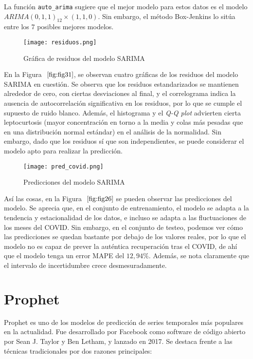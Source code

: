 \documentclass[12pt,twoside]{article}
\begin{document}
La función \texttt{auto\_arima} sugiere que el mejor modelo para estos datos es el modelo $ARIMA(0,1,1)_{12} \times (1,1,0)$. Sin embargo, el método Box-Jenkins lo sitúa entre los 7 posibles mejores modelos. 

\begin{figure}[h]
    \centering
    \texttt{[image: residuos.png]}
    \caption{Gráfica de residuos del modelo SARIMA} 
    \label{fig:fig31}
\end{figure}

En la Figura $~\ref{fig:fig31}$, se observan cuatro gráficas de los residuos del modelo SARIMA en cuestión. Se observa que los residuos estandarizados se mantienen alrededor de cero, con ciertas desviaciones al final, y el correlograma indica la ausencia de autocorrelación significativa en los residuos, por lo que se cumple el supuesto de ruido blanco. Además, el histograma y el \textit{Q-Q plot} advierten cierta leptocurtosis (mayor concentración en torno a la media y colas más pesadas que en una distribución normal estándar) en el análisis de la normalidad. Sin embargo, dado que los residuos sí que son independientes, se puede considerar el modelo apto para realizar la predicción.

\begin{figure}[h]
    \centering
    \texttt{[image: pred\_covid.png]}
    \caption{Predicciones del modelo SARIMA} 
    \label{fig:fig26}
\end{figure}

Así las cosas, en la Figura $~\ref{fig:fig26}$ se pueden observar las predicciones del modelo. Se aprecia que, en el conjunto de entrenamiento, el modelo se adapta a la tendencia y estacionalidad de los datos, e incluso se adapta a las fluctuaciones de los meses del COVID. Sin embargo, en el conjunto de testeo, podemos ver cómo las predicciones se quedan bastante por debajo de los valores reales, por lo que el modelo no es capaz de prever la auténtica recuperación tras el COVID, de ahí que el modelo tenga un error MAPE del $12,94\%$. Además, se nota claramente que el intervalo de incertidumbre crece desmesuradamente.

\newpage

\section{Prophet}\label{sec:1}

Prophet \cite{prophet1} es uno de los modelos de predicción de series temporales más populares en la actualidad. Fue desarrollado por Facebook como software de código abierto por Sean J. Taylor y Ben Letham, y lanzado en 2017. Se destaca frente a las técnicas tradicionales por dos razones principales:
\end{document}

